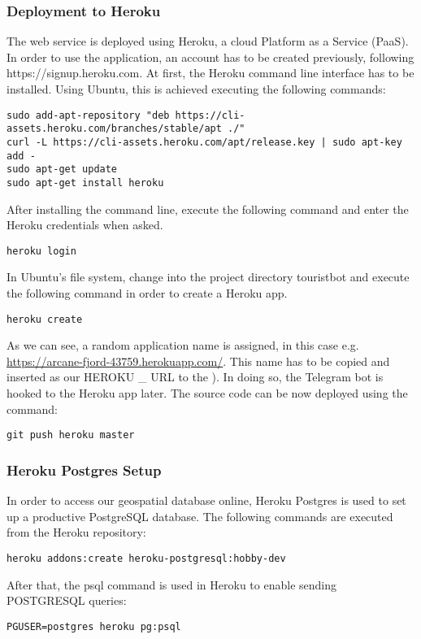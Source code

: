 \subsubsection{Deployment to Heroku}
The web service is deployed using Heroku, a cloud Platform as a Service (PaaS). In order to use the application, an account has to be created previously, following https://signup.heroku.com. 
At first, the Heroku command line interface has to be installed. Using Ubuntu, this is achieved executing the following commands:
\begin{lstlisting}
sudo add-apt-repository "deb https://cli-assets.heroku.com/branches/stable/apt ./"
curl -L https://cli-assets.heroku.com/apt/release.key | sudo apt-key add - 
sudo apt-get update
sudo apt-get install heroku
\end{lstlisting}
After installing the command line, execute the following command and enter the Heroku credentials when asked.
\begin{lstlisting}
heroku login  
\end{lstlisting}
In Ubuntu's file system, change into the project directory touristbot and execute the following command in order to create a Heroku app.
\begin{lstlisting}
heroku create
\end{lstlisting}
As we can see, a random application name is assigned, in this case e.g. \href{https://arcane-fjord-43759.herokuapp.com/}{https://arcane-fjord-43759.herokuapp.com/}. This name has to be copied and inserted as our HEROKU \_ URL to the ). In doing so, the Telegram bot is hooked to the Heroku app later.
The source code can be now deployed using the command:
\begin{lstlisting}
git push heroku master
\end{lstlisting}

\subsubsection{Heroku Postgres Setup}
In order to access our geospatial database online, Heroku Postgres is used to set up a productive PostgreSQL database. The following commands are executed from the Heroku repository:
\begin{lstlisting}
heroku addons:create heroku-postgresql:hobby-dev
\end{lstlisting}
After that, the psql command is used in Heroku to enable sending POSTGRESQL queries:
\begin{lstlisting}
PGUSER=postgres heroku pg:psql
\end{lstlisting}

